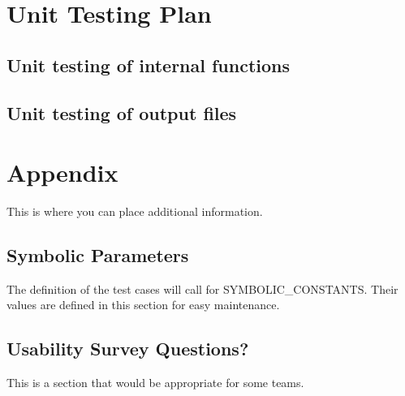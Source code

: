 \documentclass[12pt, titlepage]{article}
\begin{document}
\section{Unit Testing Plan}
		
\subsection{Unit testing of internal functions}
		
\subsection{Unit testing of output files}		





\newpage

\section{Appendix}

This is where you can place additional information.

\subsection{Symbolic Parameters}

The definition of the test cases will call for SYMBOLIC\_CONSTANTS.
Their values are defined in this section for easy maintenance.

\subsection{Usability Survey Questions?}

This is a section that would be appropriate for some teams.
\end{document}
